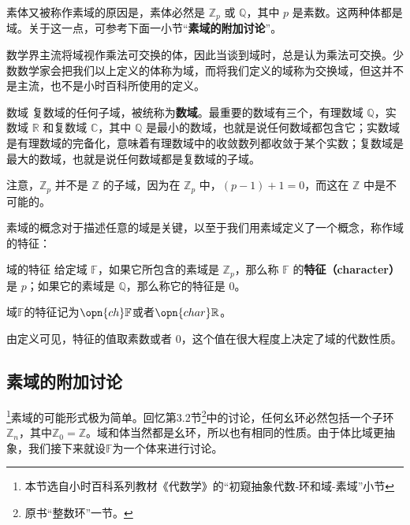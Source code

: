 素体又被称作素域的原因是，素体必然是 $\mathbb{Z}_p$ 或 $\mathbb{Q}$，其中 $p$ 是素数。这两种体都是域。关于这一点，可参考下面一小节“\textbf{素域的附加讨论}”。




数学界主流将域视作乘法可交换的体，因此当谈到域时，总是认为乘法可交换。少数数学家会把我们以上定义的体称为域，而将我们定义的域称为交换域，但这并不是主流，也不是小时百科所使用的定义。

\begin{example}{数域}
复数域的任何子域，被统称为\textbf{数域}。最重要的数域有三个，有理数域 $\mathbb{Q}$，实数域 $\mathbb{R}$ 和复数域 $\mathbb{C}$，其中 $\mathbb{Q}$ 是最小的数域，也就是说任何数域都包含它；实数域是有理数域的完备化，意味着有理数域中的收敛数列都收敛于某个实数；复数域是最大的数域，也就是说任何数域都是复数域的子域。

注意，$\mathbb{Z}_p$ 并不是 $\mathbb{Z}$ 的子域，因为在 $\mathbb{Z}_p$ 中，$(p-1)+1=0$，而这在 $\mathbb{Z}$ 中是不可能的。
\end{example}

素域的概念对于描述任意的域是关键，以至于我们用素域定义了一个概念，称作域的特征：

\begin{definition}{域的特征}\label{def_field_2}
给定域 $\mathbb{F}$，如果它所包含的素域是 $\mathbb{Z}_p$，那么称 $\mathbb{F}$ 的\textbf{特征（character）}是 $p$；如果它的素域是 $\mathbb{Q}$，那么称它的特征是 $0$。

域$\mathbb{F}$的特征记为$\opn{ch}\mathbb{F}$或者$\opn{char}\mathbb{R}$。
\end{definition}

由定义可见，特征的值取素数或者 $0$，这个值在很大程度上决定了域的代数性质。


\subsection{素域的附加讨论}

\footnote{本节选自小时百科系列教材《代数学》的“初窥抽象代数-环和域-素域”小节}素域的可能形式极为简单。回忆第3.2节\footnote{原书“整数环”一节。}中的讨论，任何幺环必然包括一个子环$\mathbb{Z}_n$，其中$\mathbb{Z}_0=\mathbb{Z}$。域和体当然都是幺环，所以也有相同的性质。由于体比域更抽象，我们接下来就设$\mathbb{F}$为一个体来进行讨论。

